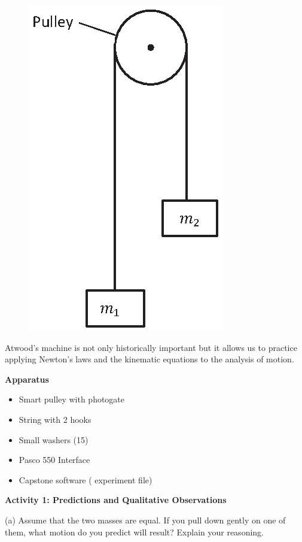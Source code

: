 \begin{figure}
\vspace{-0.8cm}
\begin{center}
    \includegraphics{atwood/atwood_fig1.eps}
\end{center}
\end{figure}
Atwood's machine is not only historically important but it allows us to practice
applying Newton's laws and the kinematic equations to the analysis of motion.

\textbf{Apparatus} 

\begin{itemize}
\item Smart pulley with photogate 
\item String with 2 hooks 
\item Small washers (15)
\item Pasco 550 Interface
\item Capstone software ( experiment file)
\end{itemize}
\textbf{Activity 1: Predictions and Qualitative Observations} 

(a) Assume that the two masses are equal. If you pull down gently on one of
them, what motion do you predict will result? Explain your reasoning.
\vspace{20mm}

